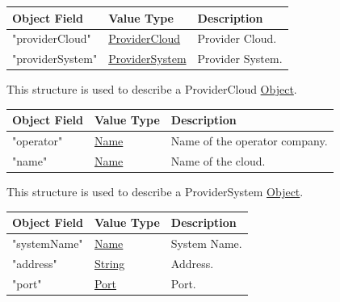 \documentclass[a4paper]{arrowhead}
\newcommand{\pref}[1]{{\textcolor{ArrowheadGrey}{\hyperref[sec:model:primitives:#1]{#1}}}}
\begin{document}
\begin{table}[ht!]
\begin{tabularx}{\textwidth}{| p{5cm} | p{6cm} | X |} \hline
\rowcolor{gray!33} Object Field & Value Type                      & Description \\ \hline
"providerCloud"         & \pref{ProviderCloud}     & Provider Cloud. \\ \hline
"providerSystem"            & \pref{ProviderSystem}   & Provider System. \\ \hline

\end{tabularx}
\end{table}


This structure is used to describe a ProviderCloud \pref{Object}. 

\begin{table}[ht!]
\begin{tabularx}{\textwidth}{| p{5cm} | p{6cm} | X |} \hline
\rowcolor{gray!33} Object Field & Value Type                      & Description \\ \hline
"operator"         & \pref{Name}     & Name of the operator company. \\ \hline
"name"            & \pref{Name}   & Name of the cloud. \\ \hline

\end{tabularx}
\end{table}


This structure is used to describe a ProviderSystem \pref{Object}. 

\begin{table}[ht!]
\begin{tabularx}{\textwidth}{| p{5cm} | p{6cm} | X |} \hline
\rowcolor{gray!33} Object Field & Value Type                      & Description \\ \hline
"systemName"         & \pref{Name}     & System Name. \\ \hline
"address"            & \pref{String}   & Address. \\ \hline
"port"               & \pref{Port}     & Port. \\ \hline

\end{tabularx}
\end{table}

\end{document}

